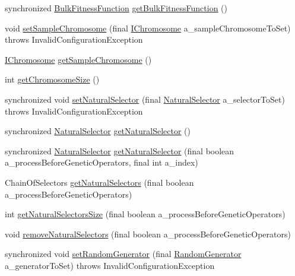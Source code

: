 \begin{DoxyCompactItemize}
\item 
synchronized \hyperlink{classorg_1_1jgap_1_1_bulk_fitness_function}{Bulk\-Fitness\-Function} \hyperlink{classorg_1_1jgap_1_1_configuration_ac8ba3b091845c57881980e50e5b3d9e9}{get\-Bulk\-Fitness\-Function} ()
\item 
void \hyperlink{classorg_1_1jgap_1_1_configuration_aac3d89beeb81bad3412a20aa6b0f15d6}{set\-Sample\-Chromosome} (final \hyperlink{interfaceorg_1_1jgap_1_1_i_chromosome}{I\-Chromosome} a\-\_\-sample\-Chromosome\-To\-Set)  throws Invalid\-Configuration\-Exception 
\item 
\hyperlink{interfaceorg_1_1jgap_1_1_i_chromosome}{I\-Chromosome} \hyperlink{classorg_1_1jgap_1_1_configuration_aab5c742aed90197791d6a60c1926e44a}{get\-Sample\-Chromosome} ()
\item 
int \hyperlink{classorg_1_1jgap_1_1_configuration_ae7ea0f8973162ab530b70d3de30c03a7}{get\-Chromosome\-Size} ()
\item 
synchronized void \hyperlink{classorg_1_1jgap_1_1_configuration_ac0c94af73f8ac7e40c3e316621c9a377}{set\-Natural\-Selector} (final \hyperlink{classorg_1_1jgap_1_1_natural_selector}{Natural\-Selector} a\-\_\-selector\-To\-Set)  throws Invalid\-Configuration\-Exception 
\item 
synchronized \hyperlink{classorg_1_1jgap_1_1_natural_selector}{Natural\-Selector} \hyperlink{classorg_1_1jgap_1_1_configuration_afdd0d844a7b68087a5726028b45ae1ce}{get\-Natural\-Selector} ()
\item 
synchronized \hyperlink{classorg_1_1jgap_1_1_natural_selector}{Natural\-Selector} \hyperlink{classorg_1_1jgap_1_1_configuration_a126a572fe657d3cc0f98c290f6608f76}{get\-Natural\-Selector} (final boolean a\-\_\-process\-Before\-Genetic\-Operators, final int a\-\_\-index)
\item 
Chain\-Of\-Selectors \hyperlink{classorg_1_1jgap_1_1_configuration_a04b6ddc360f2982ee229b8266787f678}{get\-Natural\-Selectors} (final boolean a\-\_\-process\-Before\-Genetic\-Operators)
\item 
int \hyperlink{classorg_1_1jgap_1_1_configuration_a5fcb21f123ccdd920565b31c987f20cf}{get\-Natural\-Selectors\-Size} (final boolean a\-\_\-process\-Before\-Genetic\-Operators)
\item 
void \hyperlink{classorg_1_1jgap_1_1_configuration_aa5f9c44de0f245725320282376029524}{remove\-Natural\-Selectors} (final boolean a\-\_\-process\-Before\-Genetic\-Operators)
\item 
synchronized void \hyperlink{classorg_1_1jgap_1_1_configuration_a6cec84a326ef060e3b21b4a501aa1115}{set\-Random\-Generator} (final \hyperlink{interfaceorg_1_1jgap_1_1_random_generator}{Random\-Generator} a\-\_\-generator\-To\-Set)  throws Invalid\-Configuration\-Exception 

\end{DoxyCompactItemize}
